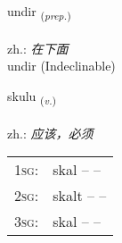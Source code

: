 \documentclass[frontgrid, backgrid]{flacards}\usepackage[]{graphicx}\usepackage[]{xcolor}
\begin{document}
\renewcommand{\blhead}{\vskip5pt {\small\bfseries\footnotesize Forsetning | 介词 }}
\renewcommand{\bcfoot}{\vskip5pt \hspace{2pt}{\small\bfseries\footnotesize 1K}}


{undir \small{\textsubscript{(\textit{prep.})}} \\[1ex]
\textphonetic{[ʏntɪr]} \\
zh.: \emph{在下面} \\  [2ex]
undir (Indeclinable)}

\renewcommand{\flhead}{\vskip5pt \fboxsep=0pt {\small\bfseries\footnotesize Sagnorð | 动词}}
\renewcommand{\fcfoot}{\vskip5pt \fboxsep=0pt \hspace{2pt}{\small\bfseries\footnotesize 1K}}

\renewcommand{\blhead}{\vskip5pt {\small\bfseries\footnotesize Sagnorð | 动词 }}
\renewcommand{\bcfoot}{\vskip5pt \hspace{2pt}{\small\bfseries\footnotesize 1K}}


{skulu \small{\textsubscript{(\textit{v.})}} \\[1ex] %
\textphonetic{[skʏːlʏ]} \\
zh.: \emph{应该，必须} \\  [2ex]
\renewcommand*{\arraystretch}{0.8}
\begin{tabular}{p{1cm}l}
\textsc{1sg}: & skal --  --  \\ 
\textsc{2sg}: & skalt --  --  \\ 
\textsc{3sg}: & skal --  --  \\ 
\end{tabular}
}


\renewcommand{\flhead}{\vskip5pt \fboxsep=0pt {\small\bfseries\footnotesize Forsetning | 介词}}
\renewcommand{\fcfoot}{\vskip5pt \fboxsep=0pt \hspace{2pt}{\small\bfseries\footnotesize 1K}}

\renewcommand{\blhead}{\vskip5pt {\small\bfseries\footnotesize Forsetning | 介词 }}
\renewcommand{\bcfoot}{\vskip5pt \hspace{2pt}{\small\bfseries\footnotesize 1K}}
\end{document}
